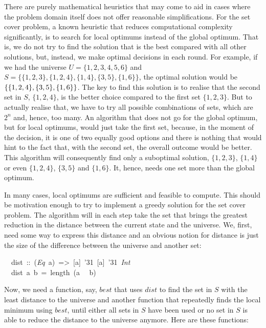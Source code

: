 \documentclass{scrreprt}
\newcommand{\texfamily}{\fontfamily{cmtex}\selectfont}
\begin{document}
There are purely mathematical
heuristics that may come to aid in cases
where the problem domain itself does not
offer reasonable simplifications.
For the set cover problem,
a known heuristic that reduces 
computational complexity significantly,
is to search for local optimums
instead of the global optimum.
That is, we do not try to find the 
solution that is the best compared
with all other solutions,
but, instead, we make optimal
decisions in each round.
For example, if we had the universe
$U = \lbrace 1,2,3,4,5,6\rbrace$
and $S = \lbrace 
\lbrace 1,2,3\rbrace,
\lbrace 1,2,4\rbrace,
\lbrace 1,4\rbrace,
\lbrace 3,5\rbrace,
\lbrace 1,6\rbrace\rbrace$,
the optimal solution would be
$\lbrace
\lbrace 1, 2, 4\rbrace, 
\lbrace 3, 5\rbrace,\\ 
\lbrace 1, 6\rbrace\rbrace$.
The key to find this solution
is to realise that 
the second set in $S$,
$\lbrace 1,2,4\rbrace$,
is the better choice compared to the first set
$\lbrace 1,2,3\rbrace$.
But to actually realise that,
we have to try all possible combinations of sets,
which are $2^n$ and, hence, too many.
An algorithm
that does not go for the global optimum,
but for local optimums,
would just take the first set,
because, in the moment of the decision,
it is one of two equally good options
and there is nothing that would hint to the fact
that, with the second set, 
the overall outcome would be better.
This  algorithm will
consequently find only a suboptimal solution,
\ie\:
$\lbrace 1,2,3\rbrace$,
$\lbrace 1,4\rbrace$ or even $\lbrace 1,2,4\rbrace$,
$\lbrace 3,5\rbrace$ and
$\lbrace 1,6\rbrace$.
It, hence, needs one set more
than the global optimum.

In many cases,
local optimums are sufficient
and feasible to compute.
This should be motivation enough
to try to implement a greedy solution
for the set cover problem.
The algorithm will in each step
take the set that brings the greatest
reduction in the distance between the current
state and the universe.
We, first, need some way to express this distance
and an obvious notion for distance
is just the size of the difference
between the universe and another set:

\begin{tabbing}\texfamily
~~dist~::~({\itshape Eq}~a)~=>~[a]~\char'31~[a]~\char'31~{\itshape Int}\\
\texfamily ~~dist~a~b~=~length~(a~  ~b)
\end{tabbing}

Now, we need a function, say, $best$
that uses $dist$ to find the set in $S$
with the least distance to the universe
and another function that 
repeatedly finds the local minimum
using $best$, until either
all sets in $S$ have been used
or no set in $S$ is able to reduce
the distance to the universe anymore.
Here are these functions:
\end{document}
